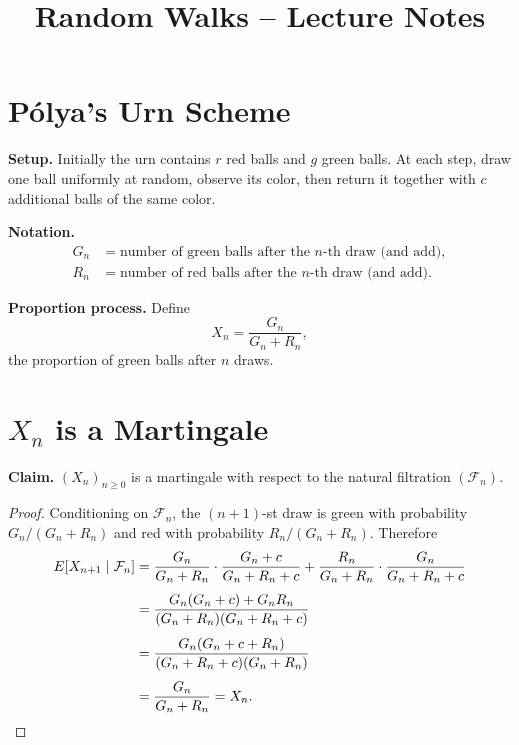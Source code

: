 \documentclass{article}
\title{Random Walks -- Lecture Notes}
\author{}
\date{}
\begin{document}
\maketitle

\section{P\'olya's Urn Scheme}

\textbf{Setup.} Initially the urn contains $r$ red balls and $g$ green balls.
At each step, draw one ball uniformly at random, observe its color, then
return it together with $c$ additional balls of the same color.

\textbf{Notation.}
\begin{align*}
  G_n &= \text{number of green balls after the }n\text{-th draw (and add)},\\
  R_n &= \text{number of red balls after the }n\text{-th draw (and add)}.
\end{align*}

\textbf{Proportion process.} Define
\[
  X_n = \frac{G_n}{G_n + R_n},
\]
the proportion of green balls after $n$ draws.

\section{$X_n$ is a Martingale}

\textbf{Claim.} $(X_n)_{n \ge 0}$ is a martingale with respect to the natural
filtration $(\mathcal{F}_n)$.

\begin{proof}
Conditioning on $\mathcal{F}_n$, the $(n+1)$-st draw is green with probability
$G_n/(G_n+R_n)$ and red with probability $R_n/(G_n+R_n)$. Therefore
\begin{align*}
  E[X_{n+1} \mid \mathcal{F}_n]
  &= \frac{G_n}{G_n+R_n} \cdot \frac{G_n+c}{G_n+R_n+c}
   + \frac{R_n}{G_n+R_n} \cdot \frac{G_n}{G_n+R_n+c} \\[4pt]
  &= \frac{G_n(G_n+c) + G_n R_n}{(G_n+R_n)(G_n+R_n+c)} \\[4pt]
  &= \frac{G_n(G_n + c + R_n)}{(G_n+R_n+c)(G_n+R_n)} \\[4pt]
  &= \frac{G_n}{G_n+R_n} = X_n. \qedhere
\end{align*}
\end{proof}
\end{document}
